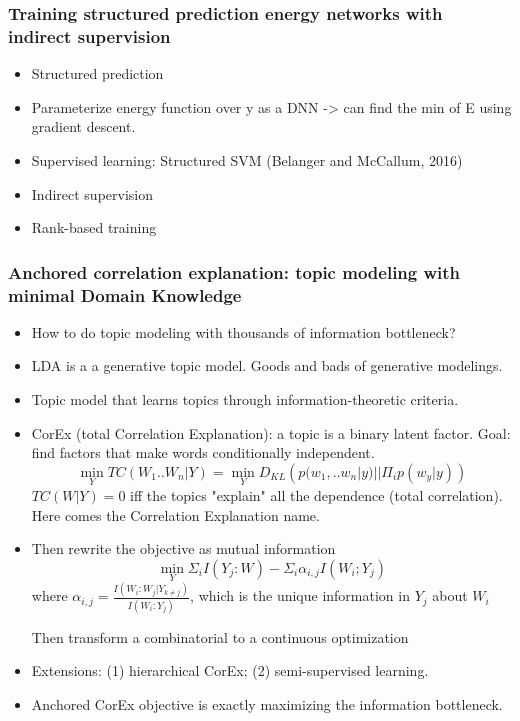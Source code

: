 \subsubsection{\cite{Rooshenas2018Training} Training structured prediction energy networks with indirect supervision}
\begin{itemize}
	\item Structured prediction
	\item Parameterize energy function over y as a DNN -> can find the min of E using gradient descent.
	\item Supervised learning: Structured SVM (Belanger and McCallum, 2016)
	\item Indirect supervision 
	\item Rank-based training
\end{itemize}


\subsubsection{\cite{gallagher2016anchored} Anchored correlation explanation: topic modeling with minimal Domain Knowledge}

\begin{itemize}
	\item How to do topic modeling with thousands of information bottleneck?
	\item LDA is a a generative topic model. Goods and bads of generative modelings.
	\item Topic model that learns topics through information-theoretic criteria.
	\item CorEx (total Correlation Explanation): a topic is a binary latent factor. Goal: find factors that make words conditionally independent. 
	$$ \min_Y TC(W_1 .. W_n | Y) = \min_Y D_{KL} \left ( p(w_1, .. w_n | y) || \Pi_i p(w_y | y) \right )$$
	$TC(W|Y)=0$ iff the topics "explain" all the dependence (total correlation). Here comes the Correlation Explanation name.
	\item Then rewrite the objective as mutual information
	$$\min_Y \Sigma_i I(Y_j : W) - \Sigma_i \alpha_{i,j} I(W_i; Y_j)$$
	where $\alpha_{i,j} = \frac{I(W_i : W_j | Y_{k \neq j})}{I(W_i : Y_j)}$, which is the unique information in $Y_j$ about $W_i$
	
	Then transform a combinatorial to a continuous optimization

	\item Extensions: (1) hierarchical CorEx; (2) semi-supervised learning.
	\item Anchored CorEx objective is exactly maximizing the information bottleneck.
\end{itemize}


